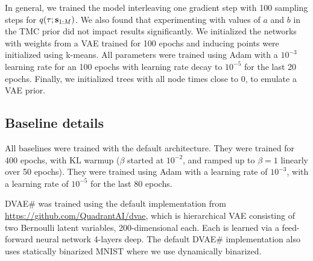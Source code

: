 In general, we trained the model interleaving
one gradient step with 100 sampling steps for $q(\tau; \mathbf{s}_{1:M})$.
We also found that experimenting with values of $a$ and $b$
in the TMC prior did not impact results significantly.
We initialized the networks with weights
from a VAE trained for 100 epochs and inducing points
were initialized using k-means. All parameters
were trained using Adam \citep{Kingma2014} with a $10^{-3}$ learning rate
for an 100 epochs with learning rate decay to $10^{-5}$ for the last 20 epochs. 
Finally, we initialized trees with all node times close to 0,
to emulate a VAE prior.

\subsection{Baseline details}
All baselines were trained with the default architecture.
They were trained for 400 epochs,
with KL warmup ($\beta$ started at $10^{-2}$, and ramped up to $\beta = 1$
linearly over 50 epochs). They were trained using Adam with a
learning rate of $10^{-3}$, with a learning rate of $10^{-5}$ for
the last 80 epochs.

DVAE\# was trained using the default implementation from
\url{https://github.com/QuadrantAI/dvae}, which is hierarchical
VAE consisting of two Bernoulli latent variables, 200-dimensional each.
Each is learned via a feed-forward neural network 4-layers deep.
The default DVAE\# implementation also uses statically binarized MNIST
where we use dynamically binarized.

